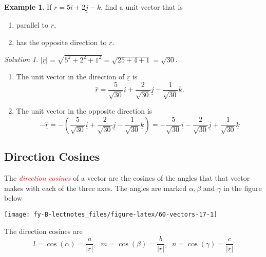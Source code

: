 \documentclass[
  11pt,
  oneside]{book}
\providecommand{\tightlist}{%
  \setlength{\itemsep}{0pt}\setlength{\parskip}{0pt}}
\newcommand{\slide}{}
\theoremstyle{definition}
\theoremstyle{definition}
\newtheorem{example}{Example}[chapter]
\theoremstyle{definition}
\theoremstyle{definition}
\theoremstyle{remark}
\newtheorem*{solution}{Solution}
\begin{document}
\begin{example}

If \(\underline r = 5\underline i+2\underline j-\underline k\), find a unit vector that is

\begin{enumerate}
\def\labelenumi{\alph{enumi}.}
\tightlist
\item
  parallel to \(\underline r\),
\item
  has the opposite direction to \(\underline r\).
\end{enumerate}

\end{example}

\begin{solution}

\(|\underline r| = \sqrt{5^2+2^2+1^2} = \sqrt{25+4+1} = \sqrt{30}\).

\begin{enumerate}
\def\labelenumi{\alph{enumi}.}
\tightlist
\item
  The unit vector in the direction of \(\underline r\) is
  \[
  \underline{\hat r} = \frac5{\sqrt{30}}\underline i+\frac2{\sqrt{30}}\underline j-\frac1{\sqrt{30}}\underline k.
  \]
\item
  The unit vector in the opposite direction is
  \[
  -\underline{\hat r} = -\left(\frac{5}{\sqrt{30}}\underline i+\frac{2}{\sqrt{30}}\underline j-\frac{1}{\sqrt{30}}\underline k\right) = -\frac{5}{\sqrt{30}}\underline i-\frac{2}{\sqrt{30}}\underline j+\frac{1}{\sqrt{30}}\underline k
  \]
\end{enumerate}

\end{solution}

\slide

\subsection{Direction Cosines}\label{direction-cosines}

The \textcolor{red}{\em direction cosines} of a vector are the cosines of the angles that that vector makes with each of
the three axes. The angles are marked \(\alpha, \beta\) and \(\gamma\) in the figure below

\begin{center}\texttt{[image: fy-B-lectnotes\_files/figure-latex/60-vectors-17-1]} \end{center}

The direction cosines are
\[
l = \cos(\alpha) = \frac{a}{|\underline r|},\;\;m = \cos(\beta) = \frac{b}{|\underline r|},\;\;n = \cos(\gamma) = \frac{c}{|\underline r|}
\]
\slide
\end{document}
